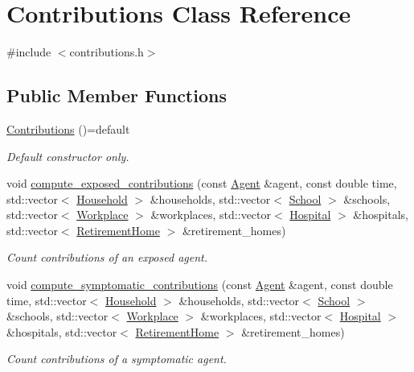 \hypertarget{classContributions}{}\section{Contributions Class Reference}
\label{classContributions}


{\ttfamily \#include $<$contributions.\+h$>$}

\subsection*{Public Member Functions}
\begin{DoxyCompactItemize}
\item 
\hyperlink{classContributions_ad6dd08ef9fd6147958ff9bd01acd9ffe}{Contributions} ()=default
\begin{DoxyCompactList}\small\item\em Default constructor only. \end{DoxyCompactList}\item 
void \hyperlink{classContributions_a4c4171fd8bca6bec6b82fff01c0546b9}{compute\+\_\+exposed\+\_\+contributions} (const \hyperlink{classAgent}{Agent} \&agent, const double time, std\+::vector$<$ \hyperlink{classHousehold}{Household} $>$ \&households, std\+::vector$<$ \hyperlink{classSchool}{School} $>$ \&schools, std\+::vector$<$ \hyperlink{classWorkplace}{Workplace} $>$ \&workplaces, std\+::vector$<$ \hyperlink{classHospital}{Hospital} $>$ \&hospitals, std\+::vector$<$ \hyperlink{classRetirementHome}{Retirement\+Home} $>$ \&retirement\+\_\+homes)
\begin{DoxyCompactList}\small\item\em Count contributions of an exposed agent. \end{DoxyCompactList}\item 
void \hyperlink{classContributions_a35e17543a6643e69d8b6eda090a8ff90}{compute\+\_\+symptomatic\+\_\+contributions} (const \hyperlink{classAgent}{Agent} \&agent, const double time, std\+::vector$<$ \hyperlink{classHousehold}{Household} $>$ \&households, std\+::vector$<$ \hyperlink{classSchool}{School} $>$ \&schools, std\+::vector$<$ \hyperlink{classWorkplace}{Workplace} $>$ \&workplaces, std\+::vector$<$ \hyperlink{classHospital}{Hospital} $>$ \&hospitals, std\+::vector$<$ \hyperlink{classRetirementHome}{Retirement\+Home} $>$ \&retirement\+\_\+homes)
\begin{DoxyCompactList}\small\item\em Count contributions of a symptomatic agent. \end{DoxyCompactList}\item 

\end{DoxyCompactItemize}
